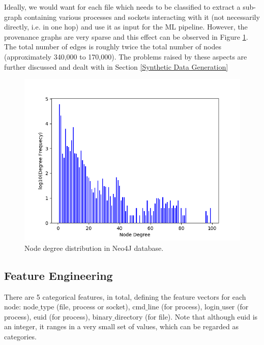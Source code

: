 Ideally, we would want for each file which needs to be classified to extract a sub-graph containing various processes and sockets interacting with it (not necessarily directly, i.e. in one hop) and use it as input for the ML pipeline. However, the provenance graphs are very sparse and this effect can be observed in Figure \ref{nodedegdist}. The total number of edges is roughly twice the total number of nodes (approximately 340,000 to 170,000). The problems raised by these aspects are further discussed and dealt with in Section \ref{Synthetic Data Generation} \\


\begin{figure}[H]
  \centering
  \centerline{\includegraphics[scale = 0.7]{Images/nodedegdist.png}}
  \caption{Node degree distribution in Neo4J database.}
  \label{nodedegdist}
\end{figure}


\subsection{Feature Engineering}

There are 5 categorical features, in total, defining the feature vectors for each node: node$\_$type (file, process or socket), cmd$\_$line (for process), login$\_$user (for process), euid (for process), binary$\_$directory (for file). Note that although euid is an integer, it ranges in a very small set of values, which can be regarded as categories. \\


